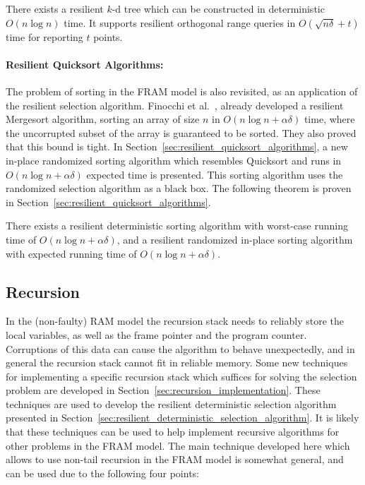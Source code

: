 \documentclass{llncs}
\begin{document}
\begin{theorem}
There exists a resilient $k$-d tree which can be constructed in deterministic $O(n \log n)$ time.
It supports resilient orthogonal range queries in $O(\sqrt{n \delta} + t)$ time for reporting $t$ points.
\end{theorem}



\paragraph{Resilient Quicksort Algorithms:}

The problem of sorting in the FRAM model is also revisited, as an application of the resilient selection algorithm. Finocchi et al.~\cite{resilient_sorting}, already developed a resilient Mergesort algorithm, sorting an array of size $n$ in $O(n\log n + \alpha\delta)$ time, where the uncorrupted subset of the array is guaranteed to be sorted. They also proved that this bound is tight. In Section~\ref{sec:resilient_quicksort_algorithms}, a new in-place randomized sorting algorithm which resembles Quicksort and runs in $O(n\log n + \alpha\delta)$ expected time is presented. This sorting algorithm uses the randomized selection algorithm as a black box.
The following theorem is proven in Section~\ref{sec:resilient_quicksort_algorithms}.

\begin{theorem}
There exists a resilient deterministic sorting algorithm with worst-case running time of $O(n\log n+\alpha\delta)$, and a resilient randomized in-place sorting algorithm with expected running time of $O(n\log n+\alpha\delta)$.
\end{theorem}








\subsection{Recursion}

In the (non-faulty) RAM model the recursion stack needs to reliably store the local variables, as well as the frame pointer and the program counter. Corruptions of this data can cause the algorithm to behave unexpectedly, and in general the recursion stack cannot fit in reliable memory. Some new techniques for implementing a specific recursion stack which suffices for solving the selection problem are developed in Section~\ref{sec:recursion_implementation}. These techniques are used to develop the resilient deterministic selection algorithm presented in Section~\ref{sec:resilient_deterministic_selection_algorithm}. It is likely that these techniques can be used to help implement recursive algorithms for other problems in the FRAM model. The main technique developed here which allows to use non-tail recursion in the FRAM model is somewhat general, and can be used due to the following four points:
\end{document}
